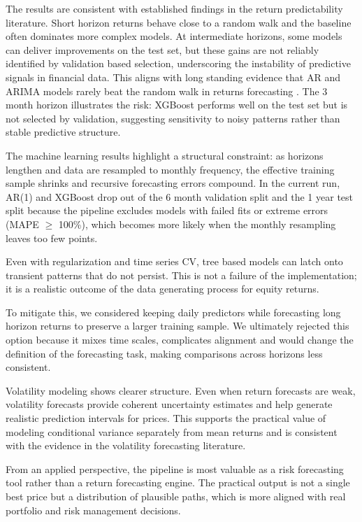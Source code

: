 \documentclass[11pt,a4paper]{article}
\begin{document}
\hspace*{\parindent}The results are consistent with established findings in the return predictability literature. Short horizon returns behave close to a random walk and the baseline often dominates more complex models. At intermediate horizons, some models can deliver improvements on the test set, but these gains are not reliably identified by validation based selection, underscoring the instability of predictive signals in financial data. This aligns with long standing evidence that AR and ARIMA models rarely beat the random walk in returns forecasting \parencite{Fama1970,Campbell1997,Hansen2005}. The 3 month horizon illustrates the risk: XGBoost performs well on the test set but is not selected by validation, suggesting sensitivity to noisy patterns rather than stable predictive structure.

\noindent The machine learning results highlight a structural constraint: as horizons lengthen and data are resampled to monthly frequency, the effective training sample shrinks and recursive forecasting errors compound. In the current run, AR(1) and XGBoost drop out of the 6 month validation split and the 1 year test split because the pipeline excludes models with failed fits or extreme errors (MAPE $\geq$ 100\%), which becomes more likely when the monthly resampling leaves too few points.

\noindent Even with regularization and time series CV, tree based models can latch onto transient patterns that do not persist. This is not a failure of the implementation; it is a realistic outcome of the data generating process for equity returns.

\noindent To mitigate this, we considered keeping daily predictors while forecasting long horizon returns to preserve a larger training sample. We ultimately rejected this option because it mixes time scales, complicates alignment and would change the definition of the forecasting task, making comparisons across horizons less consistent.

\noindent Volatility modeling shows clearer structure. Even when return forecasts are weak, volatility forecasts provide coherent uncertainty estimates and help generate realistic prediction intervals for prices. This supports the practical value of modeling conditional variance separately from mean returns and is consistent with the evidence in the volatility forecasting literature.

\noindent From an applied perspective, the pipeline is most valuable as a risk forecasting tool rather than a return forecasting engine. The practical output is not a single best price but a distribution of plausible paths, which is more aligned with real portfolio and risk management decisions.
\end{document}
